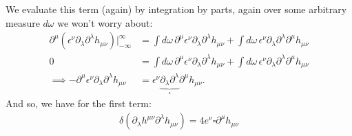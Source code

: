 \documentclass{book}
\theoremstyle{definition}
\newcommand{\p}{\partial}
\newcommand{\nn}{\nonumber}
\begin{document}
We evaluate this term (again) by integration by parts, again over some arbitrary measure $d\omega$ we won't worry about:
\begin{align}
\p^\mu (\epsilon^\nu \p_\lambda \p^\lambda h_{\mu\nu})\bigg\vert_{-\infty}^\infty &= \int d\omega\, \p^\mu \epsilon^\nu \p_\lambda \p^\lambda h_{\mu\nu} + \int d\omega\,  \epsilon^\nu \p_\lambda \p^\lambda \p^\mu h_{\mu\nu}\nn\\
0 &= \int d\omega\, \p^\mu \epsilon^\nu \p_\lambda \p^\lambda h_{\mu\nu} + \int d\omega\,  \epsilon^\nu \p_\lambda \p^\lambda \p^\mu h_{\mu\nu}\nn\\
\implies -\p^\mu \epsilon^\nu \p_\lambda \p^\lambda h_{\mu\nu} &= \epsilon^\nu \underbrace{\p_\lambda \p^\lambda}_{\square} \p^\mu h_{\mu\nu}.
\end{align}
And so, we have for the first term:
\begin{align}
\boxed{\delta (\p_\lambda h^{\mu\nu} \p^\lambda h_{\mu\nu}) = 4e^\nu \square \p^\mu h_{\mu\nu}} 
\end{align}
\end{document}
